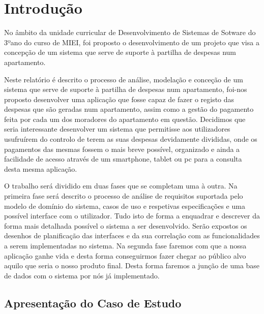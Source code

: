 \chapter{Introdução}

No âmbito da unidade curricular de Desenvolvimento de Sistemas de Sotware do 3ºano do curso de MIEI,  foi proposto o desenvolvimento de um projeto que visa a concepção de um sistema que serve de suporte à partilha de despesas num apartamento.

Neste relatório é descrito o processo de análise, modelação e conceção de um sistema que serve de suporte à partilha de despesas num apartamento, foi-nos proposto desenvolver uma aplicação que fosse capaz de fazer o registo das despesas que são geradas num apartamento, assim como a gestão do pagamento feita por cada um dos moradores do apartamento em questão.
Decidimos que seria interessante desenvolver um sistema que permitisse aos utilizadores usufruírem do controlo de terem as suas despesas devidamente divididas, onde os pagamentos das mesmas fossem o mais breve possível, organizado e ainda a facilidade de acesso através de um smartphone, tablet ou pc para a consulta desta mesma aplicação.

O trabalho será dividido em duas fases que se completam uma à outra.
Na primeira fase será descrito o processo de análise de requisitos suportada pelo modelo de domínio do sistema, casos de uso e respetivas especificações e uma possível interface com o utilizador. Tudo isto de forma a enquadrar e descrever da forma mais detalhada possível o sistema a ser desenvolvido. Serão expostos os desenhos de planificação das interfaces e da sua correlação com as funcionalidades a serem implementadas no sistema.
Na segunda fase faremos com que a nossa aplicação ganhe vida e desta forma conseguirmos fazer chegar ao público alvo aquilo que seria o nosso produto final. Desta forma faremos a junção de uma base de dados com o sistema por nós já implementado.

\section{Apresentação do Caso de Estudo}


